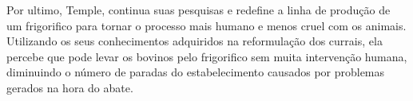 Por ultimo, Temple, continua suas pesquisas e redefine a linha de produção de um frigorifico
para tornar o processo mais humano e menos cruel com os animais. Utilizando os seus 
conhecimentos adquiridos na reformulação dos currais, ela percebe que pode levar os bovinos
pelo frigorifico sem muita intervenção humana, diminuindo o número de paradas do estabelecimento
causados por problemas gerados na hora do abate.





